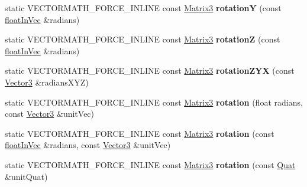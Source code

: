 \begin{DoxyCompactItemize}
static V\+E\+C\+T\+O\+R\+M\+A\+T\+H\+\_\+\+F\+O\+R\+C\+E\+\_\+\+I\+N\+L\+I\+NE const \hyperlink{classVectormath_1_1Aos_1_1Matrix3}{Matrix3} {\bfseries rotationY} (const \hyperlink{classVectormath_1_1floatInVec}{float\+In\+Vec} \&radians)
\item 
\mbox{\label{classVectormath_1_1Aos_1_1Matrix3_a3a75ad2c225b491cbf238980c4575583}} 
static V\+E\+C\+T\+O\+R\+M\+A\+T\+H\+\_\+\+F\+O\+R\+C\+E\+\_\+\+I\+N\+L\+I\+NE const \hyperlink{classVectormath_1_1Aos_1_1Matrix3}{Matrix3} {\bfseries rotationZ} (const \hyperlink{classVectormath_1_1floatInVec}{float\+In\+Vec} \&radians)
\item 
\mbox{\label{classVectormath_1_1Aos_1_1Matrix3_a52ce43d108608ab358db15b80020af20}} 
static V\+E\+C\+T\+O\+R\+M\+A\+T\+H\+\_\+\+F\+O\+R\+C\+E\+\_\+\+I\+N\+L\+I\+NE const \hyperlink{classVectormath_1_1Aos_1_1Matrix3}{Matrix3} {\bfseries rotation\+Z\+YX} (const \hyperlink{classVectormath_1_1Aos_1_1Vector3}{Vector3} \&radians\+X\+YZ)
\item 
\mbox{\label{classVectormath_1_1Aos_1_1Matrix3_a0a03cea9ec13b69af30adb7aed9550a8}} 
static V\+E\+C\+T\+O\+R\+M\+A\+T\+H\+\_\+\+F\+O\+R\+C\+E\+\_\+\+I\+N\+L\+I\+NE const \hyperlink{classVectormath_1_1Aos_1_1Matrix3}{Matrix3} {\bfseries rotation} (float radians, const \hyperlink{classVectormath_1_1Aos_1_1Vector3}{Vector3} \&unit\+Vec)
\item 
\mbox{\label{classVectormath_1_1Aos_1_1Matrix3_a3e012c647f58c8bd92fe8ce8950ab5b6}} 
static V\+E\+C\+T\+O\+R\+M\+A\+T\+H\+\_\+\+F\+O\+R\+C\+E\+\_\+\+I\+N\+L\+I\+NE const \hyperlink{classVectormath_1_1Aos_1_1Matrix3}{Matrix3} {\bfseries rotation} (const \hyperlink{classVectormath_1_1floatInVec}{float\+In\+Vec} \&radians, const \hyperlink{classVectormath_1_1Aos_1_1Vector3}{Vector3} \&unit\+Vec)
\item 
\mbox{\label{classVectormath_1_1Aos_1_1Matrix3_a1089e04865b25cfecd7f822e98c47aaa}} 
static V\+E\+C\+T\+O\+R\+M\+A\+T\+H\+\_\+\+F\+O\+R\+C\+E\+\_\+\+I\+N\+L\+I\+NE const \hyperlink{classVectormath_1_1Aos_1_1Matrix3}{Matrix3} {\bfseries rotation} (const \hyperlink{classVectormath_1_1Aos_1_1Quat}{Quat} \&unit\+Quat)
\item 

\end{DoxyCompactItemize}
